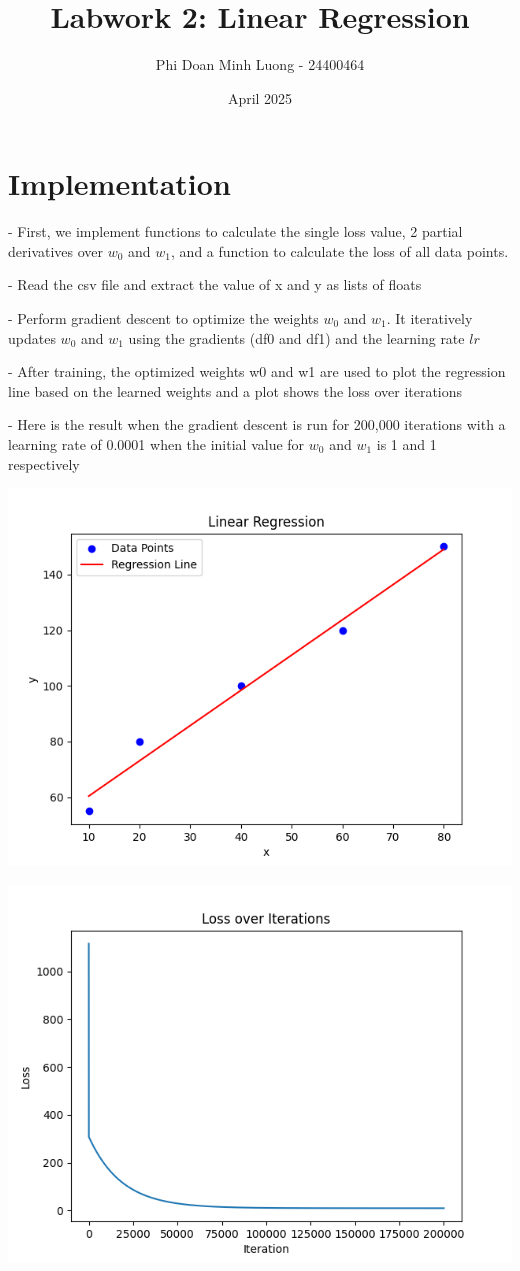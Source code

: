 \documentclass{article}
\title{Labwork 2: Linear Regression}
\author{Phi Doan Minh Luong - 24400464}
\date{April 2025}
\begin{document}
\maketitle

\setlength\parindent{0pt}

\section{Implementation}
- First, we implement functions to calculate the single loss value, 2 partial derivatives over $w_0$ and $w_1$, and a function to calculate the loss of all data points.

- Read the csv file and extract the value of x and y as lists of floats

- Perform gradient descent to optimize the weights $w_0$ and $w_1$. It iteratively updates $w_0$ and $w_1$ using the gradients (df0 and df1) and the learning rate $lr$

- After training, the optimized weights w0 and w1 are used to plot the regression line based on the learned weights and a plot shows the loss over iterations

- Here is the result when the gradient descent is run for 200,000 iterations with a learning rate of 0.0001 when the initial value for $w_0$ and $w_1$ is 1 and 1 respectively

\begin{center}
    \includegraphics[width=0.5\linewidth]{1.png}

    \includegraphics[width=0.5\linewidth]{2.png}
    
\end{center}
\end{document}
